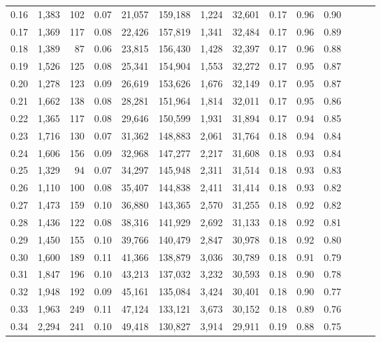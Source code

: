 \begin{tabular}{rrrrrrrrrrrrrr}
0.16 &  1,383 &  102 &  0.07 &   21,057 &  159,188 &   1,224 &  32,601 &  0.17 &  0.96 &      0.90 \\
0.17 &  1,369 &  117 &  0.08 &   22,426 &  157,819 &   1,341 &  32,484 &  0.17 &  0.96 &      0.89 \\
0.18 &  1,389 &   87 &  0.06 &   23,815 &  156,430 &   1,428 &  32,397 &  0.17 &  0.96 &      0.88 \\
0.19 &  1,526 &  125 &  0.08 &   25,341 &  154,904 &   1,553 &  32,272 &  0.17 &  0.95 &      0.87 \\
0.20 &  1,278 &  123 &  0.09 &   26,619 &  153,626 &   1,676 &  32,149 &  0.17 &  0.95 &      0.87 \\
0.21 &  1,662 &  138 &  0.08 &   28,281 &  151,964 &   1,814 &  32,011 &  0.17 &  0.95 &      0.86 \\
0.22 &  1,365 &  117 &  0.08 &   29,646 &  150,599 &   1,931 &  31,894 &  0.17 &  0.94 &      0.85 \\
0.23 &  1,716 &  130 &  0.07 &   31,362 &  148,883 &   2,061 &  31,764 &  0.18 &  0.94 &      0.84 \\
0.24 &  1,606 &  156 &  0.09 &   32,968 &  147,277 &   2,217 &  31,608 &  0.18 &  0.93 &      0.84 \\
0.25 &  1,329 &   94 &  0.07 &   34,297 &  145,948 &   2,311 &  31,514 &  0.18 &  0.93 &      0.83 \\
0.26 &  1,110 &  100 &  0.08 &   35,407 &  144,838 &   2,411 &  31,414 &  0.18 &  0.93 &      0.82 \\
0.27 &  1,473 &  159 &  0.10 &   36,880 &  143,365 &   2,570 &  31,255 &  0.18 &  0.92 &      0.82 \\
0.28 &  1,436 &  122 &  0.08 &   38,316 &  141,929 &   2,692 &  31,133 &  0.18 &  0.92 &      0.81 \\
0.29 &  1,450 &  155 &  0.10 &   39,766 &  140,479 &   2,847 &  30,978 &  0.18 &  0.92 &      0.80 \\
0.30 &  1,600 &  189 &  0.11 &   41,366 &  138,879 &   3,036 &  30,789 &  0.18 &  0.91 &      0.79 \\
0.31 &  1,847 &  196 &  0.10 &   43,213 &  137,032 &   3,232 &  30,593 &  0.18 &  0.90 &      0.78 \\
0.32 &  1,948 &  192 &  0.09 &   45,161 &  135,084 &   3,424 &  30,401 &  0.18 &  0.90 &      0.77 \\
0.33 &  1,963 &  249 &  0.11 &   47,124 &  133,121 &   3,673 &  30,152 &  0.18 &  0.89 &      0.76 \\
0.34 &  2,294 &  241 &  0.10 &   49,418 &  130,827 &   3,914 &  29,911 &  0.19 &  0.88 &      0.75 \\

\end{tabular}
